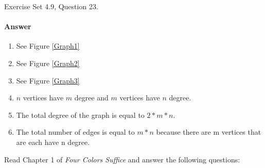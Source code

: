 \documentclass{article}
\begin{document}
Exercise Set 4.9, Question 23.

\paragraph{Answer}
\begin{enumerate}[label=\Alph*]
\item See Figure \ref{Graph1}
\item See Figure \ref{Graph2}
\item See Figure \ref{Graph3}
\item $n$ vertices have $m$ degree and $m$ vertices have $n$ degree.
\item The total degree of the graph is equal to $2*m*n$.
\item The total number of edges is equal to $m*n$ because there are m vertices that are each have n degree.
\end{enumerate}


Read Chapter 1 of \emph{Four Colors Suffice} and answer the following questions:
\end{document}

